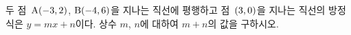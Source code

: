 두 점~$\mathrm{A}(-3{,}\mkern3mu\mathopen{}2)$, $\mathrm{B}(-4{,}\mkern3mu\mathopen{}6)$을 지나는 직선에 평행하고 점~$(3{,}\mkern3mu\mathopen{}0)$을 지나는 직선의 방정식은 $y=mx+n$이다. 상수 $m$, $n$에 대하여 $m+n$의 값을 구하시오.

